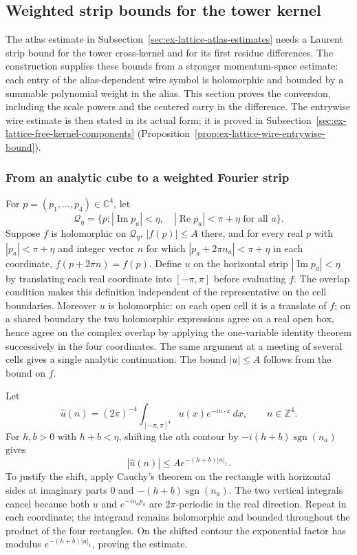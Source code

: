 \subsection{Weighted strip bounds for the tower kernel}
\label{sec:ex-lattice-free-kernel-estimates}

The atlas estimate in Subsection~\ref{sec:ex-lattice-atlas-estimates} needs a
Laurent strip bound for the tower cross-kernel and for its first residue
differences. The construction supplies these bounds from a stronger
momentum-space estimate: each entry of the alias-dependent wire symbol is
holomorphic and bounded by a summable polynomial weight in the alias. This
section proves the conversion, including the scale powers and the centered
carry in the difference. The entrywise wire estimate is then stated in its
actual form; it is proved in Subsection~\ref{sec:ex-lattice-free-kernel-components}
(Proposition~\ref{prop:ex-lattice-wire-entrywise-bound}).

\subsubsection{From an analytic cube to a weighted Fourier strip}

For $p=(p_1,\ldots,p_4)\in\mathbb C^4$, let
\[
 \mathcal Q_\eta=\{p: |\operatorname{Im}p_a|<\eta,\quad
                 |\operatorname{Re}p_a|<\pi+\eta\text{ for all }a\}.
\]
Suppose $f$ is holomorphic on $\mathcal Q_\eta$, $|f(p)|\leq A$ there,
and for every real $p$ with $|p_a|<\pi+\eta$ and integer vector $n$ for
which $|p_a+2\pi n_a|<\pi+\eta$ in each coordinate,
$f(p+2\pi n)=f(p)$. Define $u$ on the horizontal strip
$|\operatorname{Im}p_a|<\eta$ by translating each real coordinate into
$[-\pi,\pi]$ before evaluating $f$. The overlap condition makes this
definition independent of the representative on the cell boundaries.
Moreover $u$ is holomorphic: on each open cell it is a translate of $f$;
on a shared boundary the two holomorphic expressions agree on a real open
box, hence agree on the complex overlap by applying the one-variable identity
theorem successively in the four coordinates. The same argument at a meeting
of several cells gives a single analytic continuation. The bound
$|u|\leq A$ follows from the bound on $f$.

Let
\[
 \widehat u(n)=(2\pi)^{-4}\int_{[-\pi,\pi]^4}
       u(x)e^{-i n\cdot x}\,dx,\qquad n\in\mathbb Z^4.
\]
For $h,b>0$ with $h+b<\eta$, shifting the $a$th contour by
$-i(h+b)\operatorname{sgn}(n_a)$ gives
\begin{equation}
 |\widehat u(n)|\leq A e^{-(h+b)|n|_1}.
 \label{eq:ex-lattice-wire-coefficient}
\end{equation}
To justify the shift, apply Cauchy's theorem on the rectangle with horizontal
sides at imaginary parts $0$ and $-(h+b)\operatorname{sgn}(n_a)$. The two
vertical integrals cancel because both $u$ and $e^{-in_ap_a}$ are
$2\pi$-periodic in the real direction. Repeat in each coordinate; the
integrand remains holomorphic and bounded throughout the product of the four
rectangles. On the shifted contour the exponential factor has modulus
$e^{-(h+b)|n|_1}$, proving the estimate.

